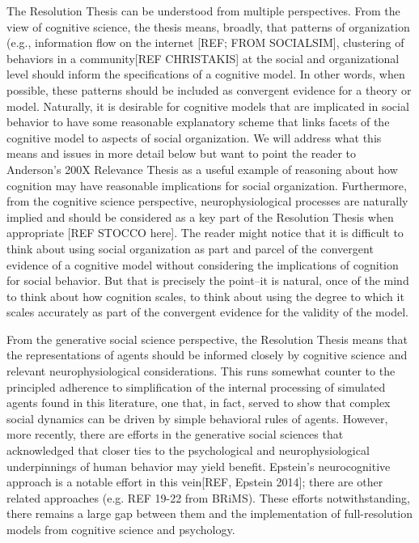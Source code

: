 \documentclass{article}
\begin{document}
The Resolution Thesis can be understood from multiple perspectives.  From the view of cognitive science, the thesis means, broadly, that patterns of organization (e.g., information flow on the internet [REF; FROM SOCIALSIM], clustering of behaviors in a community[REF CHRISTAKIS] at the social and organizational level should inform the specifications of a cognitive model.  In other words, when possible, these patterns should be included as convergent evidence for a theory or model.  Naturally, it is desirable for cognitive models that are implicated in social behavior to have some reasonable explanatory scheme that links facets of the cognitive model to aspects of social organization.   We will address what this means and issues in more detail below but want to point the reader to Anderson's 200X Relevance Thesis as a useful example of reasoning about how cognition may have reasonable implications for social organization.   Furthermore, from the cognitive science perspective, neurophysiological processes are naturally implied and should be considered as a key part of the Resolution Thesis when appropriate [REF STOCCO here].  The reader might notice that it is difficult to think about using social organization as part and parcel of the convergent evidence of a cognitive model without considering the implications of cognition for social behavior.  But that is precisely the point--it is natural, once of the mind to think about how cognition scales, to think about using the degree to which it scales accurately as part of the convergent evidence for the validity of the model.


From the generative social science perspective, the Resolution Thesis means that the representations of agents should be informed closely by cognitive science and relevant neurophysiological considerations.  This runs somewhat counter to the principled adherence to simplification of the internal processing of simulated agents found in this literature, one that, in fact, served to show that complex social dynamics can be driven by simple behavioral rules of agents.  However, more recently, there are efforts in the generative social sciences that acknowledged that closer ties to the psychological and neurophysiological underpinnings of human behavior may yield benefit.  Epstein's neurocognitive approach is a notable effort in this vein[REF, Epstein 2014]; there are other related approaches (e.g. REF 19-22 from BRiMS).  These efforts notwithstanding, there remains a large gap between them and the implementation of full-resolution models from cognitive science and psychology.  
\end{document}
